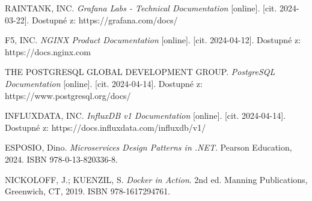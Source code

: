 \documentclass[a4paper,12pt]{article}
\begin{document}
{%
RAINTANK, INC. \emph{Grafana Labs - Technical Documentation} [online]. [cit. 2024-03-22]. Dostupné z: https://grafana.com/docs/

 F5, INC. \emph{NGINX Product Documentation} [online]. [cit. 2024-04-12]. Dostupné z: https://docs.nginx.com

THE POSTGRESQL GLOBAL DEVELOPMENT GROUP. \emph{PostgreSQL Documentation} [online]. [cit. 2024-04-14]. Dostupné z: https://www.postgresql.org/docs/

INFLUXDATA, INC. \emph{InfluxDB v1 Documentation} [online]. [cit. 2024-04-14]. Dostupné z: https://docs.influxdata.com/influxdb/v1/

ESPOSIO, Dino. \emph{Microservices Design Patterns in .NET}. Pearson Education, 2024. ISBN 978-0-13-820336-8.

NICKOLOFF, J.; KUENZIL, S. \emph{Docker in Action}. 2nd ed. Manning Publications, Greenwich, CT, 2019. ISBN 978-1617294761.

}





\seznamobr  %


\seznamtab  %




\end{document}
